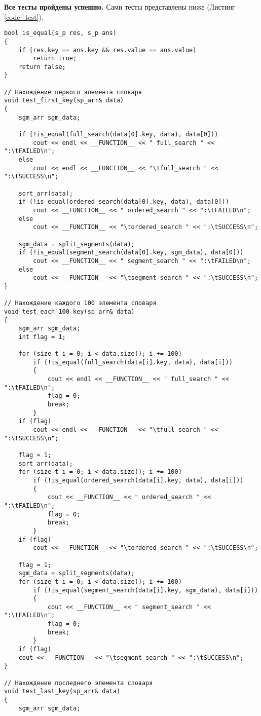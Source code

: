 \textbf{Все тесты пройдены успешно.} Сами тесты представлены ниже (Листинг \ref{code_test}).\\

\begin{lstlisting}[label=code_test, caption = Тесты]
bool is_equal(s_p res, s_p ans)
{
	if (res.key == ans.key && res.value == ans.value)
		return true;
	return false;
}

// Нахождение первого элемента словаря
void test_first_key(sp_arr& data)
{
	sgm_arr sgm_data;
	
	if (!is_equal(full_search(data[0].key, data), data[0]))
		cout << endl << __FUNCTION__ << " full_search " << ":\tFAILED\n";
	else
		cout << endl << __FUNCTION__ << "\tfull_search " << ":\tSUCCESS\n";
	
	sort_arr(data);
	if (!is_equal(ordered_search(data[0].key, data), data[0]))
		cout << __FUNCTION__ << " ordered_search " << ":\tFAILED\n";
	else
		cout << __FUNCTION__ << "\tordered_search " << ":\tSUCCESS\n";
	
	sgm_data = split_segments(data);
	if (!is_equal(segment_search(data[0].key, sgm_data), data[0]))
		cout << __FUNCTION__ << " segment_search " << ":\tFAILED\n";
	else
		cout << __FUNCTION__ << "\tsegment_search " << ":\tSUCCESS\n";
}

// Нахождение каждого 100 элемента словаря
void test_each_100_key(sp_arr& data)
{
	sgm_arr sgm_data;
	int flag = 1;
	
	for (size_t i = 0; i < data.size(); i += 100)
		if (!is_equal(full_search(data[i].key, data), data[i]))
		{
			cout << endl << __FUNCTION__ << " full_search " << ":\tFAILED\n";
			flag = 0;
			break;
		}
	if (flag)
		cout << endl << __FUNCTION__ << "\tfull_search " << ":\tSUCCESS\n";
	
	flag = 1;
	sort_arr(data);
	for (size_t i = 0; i < data.size(); i += 100)
		if (!is_equal(ordered_search(data[i].key, data), data[i]))
		{
			cout << __FUNCTION__ << " ordered_search " << ":\tFAILED\n";
			flag = 0;
			break;
		}
	if (flag)
		cout << __FUNCTION__ << "\tordered_search " << ":\tSUCCESS\n";
	
	flag = 1;
	sgm_data = split_segments(data);
	for (size_t i = 0; i < data.size(); i += 100)
		if (!is_equal(segment_search(data[i].key, sgm_data), data[i]))
		{
			cout << __FUNCTION__ << " segment_search " << ":\tFAILED\n";
			flag = 0;
			break;
		}
	if (flag)
	cout << __FUNCTION__ << "\tsegment_search " << ":\tSUCCESS\n";
}

// Нахождение последнего элемента словаря
void test_last_key(sp_arr& data)
{
	sgm_arr sgm_data;
	

\end{lstlisting}
